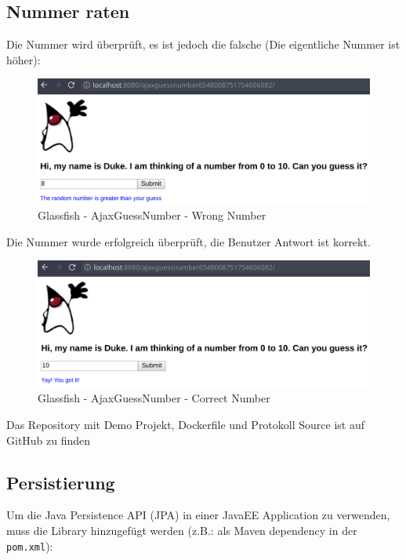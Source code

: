 \subsection{Nummer raten}

Die Nummer wird überprüft, es ist jedoch die falsche (Die eigentliche Nummer ist höher):
\begin{figure}
    \centering
    \includegraphics[width=\textwidth]{images/app-wrong-guess}
    \caption{Glassfish - AjaxGuessNumber - Wrong Number}
\end{figure}

Die Nummer wurde erfolgreich überprüft, die Benutzer Antwort ist korrekt.
\begin{figure}
    \centering
    \includegraphics[width=\textwidth]{images/app-correct-guess}
    \caption{Glassfish - AjaxGuessNumber - Correct Number}
\end{figure}


\clearpage

Das Repository mit Demo Projekt, Dockerfile und Protokoll Source ist auf GitHub zu finden \cite{github:project}


\clearpage
\subsection{Persistierung}

Um die Java Persistence API (JPA) in einer JavaEE Application zu verwenden, muss die Library hinzugefügt werden (z.B.: als Maven dependency in der \texttt{pom.xml}):

